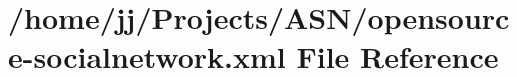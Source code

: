 \hypertarget{opensource-socialnetwork_8xml}{}\section{/home/jj/\+Projects/\+A\+S\+N/opensource-\/socialnetwork.xml File Reference}
\label{opensource-socialnetwork_8xml}
